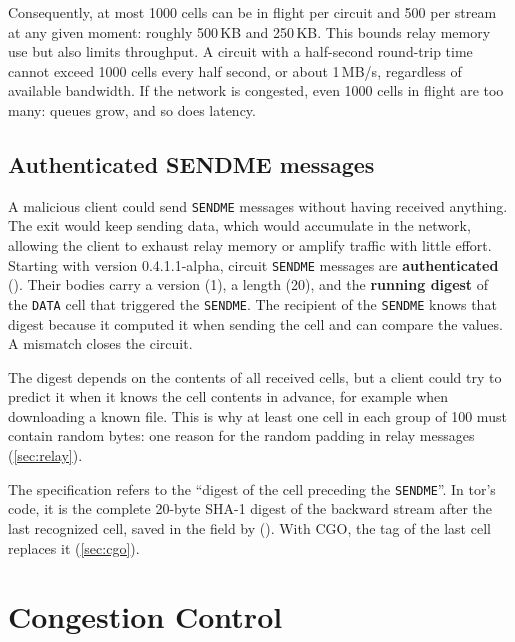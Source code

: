 Consequently, at most 1000 cells can be in flight per circuit and 500 per stream at any given moment: roughly 500\,KB and 250\,KB. This bounds relay memory use but also limits throughput. A circuit with a half-second round-trip time cannot exceed 1000 cells every half second, or about 1\,MB/s, regardless of available bandwidth. If the network is congested, even 1000 cells in flight are too many: queues grow, and so does latency.

\subsection{Authenticated SENDME messages}

A malicious client could send \texttt{SENDME} messages without having received anything. The exit would keep sending data, which would accumulate in the network, allowing the client to exhaust relay memory or amplify traffic with little effort. Starting with version 0.4.1.1-alpha, circuit \texttt{SENDME} messages are \textbf{authenticated} (). Their bodies carry a version (1), a length (20), and the \textbf{running digest} of the \texttt{DATA} cell that triggered the \texttt{SENDME}. The recipient of the \texttt{SENDME} knows that digest because it computed it when sending the cell and can compare the values. A mismatch closes the circuit.

The digest depends on the contents of all received cells, but a client could try to predict it when it knows the cell contents in advance, for example when downloading a known file. This is why at least one cell in each group of 100 must contain random bytes: one reason for the random padding in relay messages (\cref{sec:relay}).

\begin{approfondimento}
The specification refers to the \enquote{digest of the cell preceding the \texttt{SENDME}}. In tor's code, it is the complete 20-byte SHA-1 digest of the backward stream after the last recognized cell, saved in the  field by  (). With CGO, the tag of the last cell replaces it (\cref{sec:cgo}).
\end{approfondimento}

\section{Congestion Control}\label{sec:cc}

